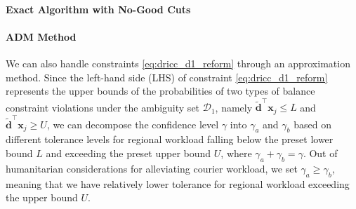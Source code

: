 \documentclass[preprint,12pt,authoryear]{elsarticle}
\begin{document}
\paragraph{Exact Algorithm with No-Good Cuts}


\paragraph{ADM Method}
We can also handle constraints \eqref{eq:dricc_d1_reform} through an approximation method. Since the left-hand side (LHS) of constraint \eqref{eq:dricc_d1_reform} represents the upper bounds of the probabilities of two types of balance constraint violations under the ambiguity set $\mathcal{D}_1$, namely $\widetilde{\mathbf{d}}^\top \mathbf{x}_j \leqslant L$ and $\widetilde{\mathbf{d}}^\top \mathbf{x}_j \geqslant U$, we can decompose the confidence level $\gamma$ into $\gamma_a$ and $\gamma_b$ based on different tolerance levels for regional workload falling below the preset lower bound $L$ and exceeding the preset upper bound $U$, where $\gamma_a + \gamma_b = \gamma$. Out of humanitarian considerations for alleviating courier workload, we set $\gamma_a \geqslant \gamma_b$, meaning that we have relatively lower tolerance for regional workload exceeding the upper bound $U$. 
\end{document}
